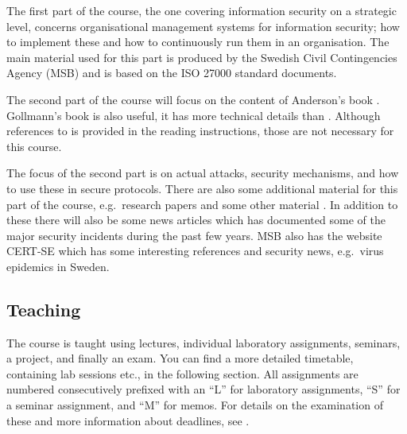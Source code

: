 \documentclass[a4paper,logo]{miunart}
\begin{document}
The first part of the course, the one covering information security on 
a strategic level, concerns organisational management systems for information 
security; how to implement these and how to continuously run them in an 
organisation.
The main material used for this part \cite{%
  MSB2011itm,MSB2011sle,MSB2011p,%
	MSB2011v,MSB2011r,MSB2011gap,MSB2011gb,%
	MSB2011vs,MSB2011us,MSB2011upo,%
	MSB2011pg,MSB2011koa,MSB2011i,%
	MSB2011o,MSB2011g,MSB2011lg,%
	MSB2011ulo,MSB2011kf,MSB2011fa%
} is produced by the Swedish Civil Contingencies Agency (MSB) and is based on 
the ISO 27000 standard documents.

The second part of the course will focus on the content of Anderson's book 
 \cite{Anderson2008sea}.
Gollmann's book  \cite{Gollmann2011cs} is also 
useful, it has more technical details than \cite{Anderson2008sea}.
Although references to \cite{Gollmann2011cs} is provided in the reading 
instructions, those are not necessary for this course.

The focus of the second part is on actual attacks, security mechanisms, and how 
to use these in secure protocols.
There are also some additional material for this part of the course, 
e.g.~research papers \cite{%
  Juels2012sha,%
  Komanduri2011opa%
} and some other material \cite{Bosk2013gl,Bosk2013itn}.
In addition to these there will also be some news articles \cite{%
  Honan2012haa,%
  Zetter2012hnt,%
  Fisher2011rsa,%
  Hunt2011abs,%
  Cluley2012twp,%
  Oberheide2010bao,%
  Cubrilovic2009rhf%
} which has documented some of the major security incidents during the past few 
years.
MSB also has the website CERT-SE \cite{CERT-SE} which has some interesting 
references and security news, e.g.~virus epidemics in Sweden.

\subsection{Teaching}

The course is taught using lectures, individual laboratory assignments, 
seminars, a project, and finally an exam.
You can find a more detailed timetable, containing lab sessions etc., in the 
following section.
All assignments are numbered consecutively prefixed with an \enquote{L} for 
laboratory assignments, \enquote{S} for a seminar assignment, and \enquote{M} 
for memos.
For details on the examination of these and more information about deadlines, 
see .
\end{document}
